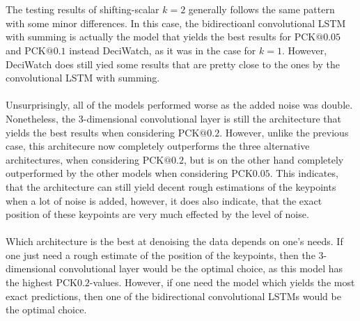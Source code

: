 \documentclass[./main.tex]{subfiles}
\begin{document}
\\
\\
The testing results of shifting-scalar $k = 2$ generally follows the same pattern with some minor differences. In this case, the bidirectioanl convolutional LSTM with summing is actually the model that yields the best results for PCK$@0.05$ and PCK$@0.1$ instead DeciWatch, as it was in the case for $k = 1$. However, DeciWatch does still yied some results that are pretty close to the ones by the convolutional LSTM with summing.
\\
\\
Unsurprisingly, all of the models performed worse as the added noise was double. Nonetheless, the 3-dimensional convolutional layer is still the architecture that yields the best results when considering PCK$@0.2$. However, unlike the previous case, this architecure now completely outperforms the three alternative architectures, when considering PCK$@0.2$, but is on the other hand completely outperformed by the other models when considering PCK$0.05$. This indicates, that the architecture can still yield decent rough estimations of the keypoints when a lot of noise is added, however, it does also indicate, that the exact position of these keypoints are very much effected by the level of noise.
\\
\\
Which architecture is the best at denoising the data depends on one's needs. If one just need a rough estimate of the position of the keypoints, then the 3-dimensional convolutional layer would be the optimal choice, as this model has the highest PCK$0.2$-values. However, if one need the model which yields the most exact predictions, then one of the bidirectional convolutional LSTMs would be the optimal choice.
\end{document}
